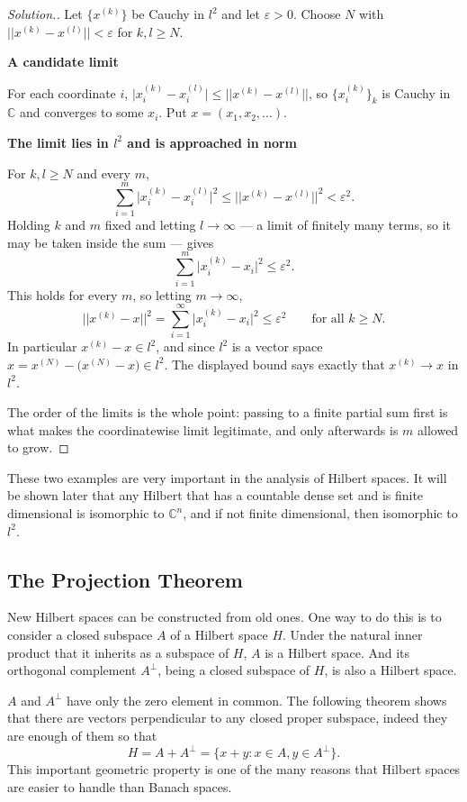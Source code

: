 \documentclass[11pt,a4paper]{article}
\theoremstyle{definition}
\newenvironment{solution}
  {\renewcommand{\qedsymbol}{}\begin{proof}[\textit{Solution}.]}
  {\end{proof}}
\newcommand{\subhead}[1]{%
  \par\medskip\noindent\textbf{#1}\par\nobreak\smallskip}
\begin{document}
\begin{solution}
Let $\{x^{(k)}\}$ be Cauchy in $l^2$ and let $\varepsilon>0$. Choose $N$ with
$||x^{(k)}-x^{(l)}||<\varepsilon$ for $k,l\geq N$.

\subhead{A candidate limit}
For each coordinate $i$,
$\big|x^{(k)}_i-x^{(l)}_i\big|\leq ||x^{(k)}-x^{(l)}||$, so $\{x^{(k)}_i\}_k$ is
Cauchy in $\mathbb{C}$ and converges to some $x_i$. Put $x=(x_1,x_2,\dots)$.

\subhead{The limit lies in $l^2$ and is approached in norm}
For $k,l\geq N$ and every $m$,
$$\sum_{i=1}^{m}\big|x^{(k)}_i-x^{(l)}_i\big|^2\leq ||x^{(k)}-x^{(l)}||^2
<\varepsilon^2 .$$
Holding $k$ and $m$ fixed and letting $l\rightarrow\infty$ --- a limit of
finitely many terms, so it may be taken inside the sum --- gives
$$\sum_{i=1}^{m}\big|x^{(k)}_i-x_i\big|^2\leq\varepsilon^2 .$$
This holds for every $m$, so letting $m\rightarrow\infty$,
$$||x^{(k)}-x||^2=\sum_{i=1}^{\infty}\big|x^{(k)}_i-x_i\big|^2
\leq\varepsilon^2\qquad\text{for all }k\geq N .$$
In particular $x^{(k)}-x\in l^2$, and since $l^2$ is a vector space
$x=x^{(N)}-\big(x^{(N)}-x\big)\in l^2$. The displayed bound says exactly that
$x^{(k)}\rightarrow x$ in $l^2$.

The order of the limits is the whole point: passing to a finite partial sum
first is what makes the coordinatewise limit legitimate, and only afterwards is
$m$ allowed to grow.
\end{solution}


These two examples are very important in the analysis of Hilbert spaces. It will be shown later that any Hilbert that has a countable dense set and is finite dimensional is isomorphic to $\mathbb{C}^n$, and if not finite dimensional, then isomorphic to $l^2$.


\pagebreak
\subsection{The Projection Theorem}
New Hilbert spaces can be constructed from old ones. One way to do this is to consider a closed subspace $A$ of a Hilbert space $H$. Under the natural inner product that it inherits as a subspace of $H$, $A$ is a Hilbert space. And its orthogonal complement $A^{\perp}$, being a closed subspace of $H$, is also a Hilbert space.

$A$ and $A^{\perp}$ have only the zero element in common. The following theorem shows that there are vectors perpendicular to any closed proper subspace, indeed they are enough of them so that $$H=A+A^{\perp}=\{x+y:x\in A,y\in A^{\perp}\}.$$ This important geometric property is one of the many reasons that Hilbert spaces are easier to handle than Banach spaces.\\
\end{document}
